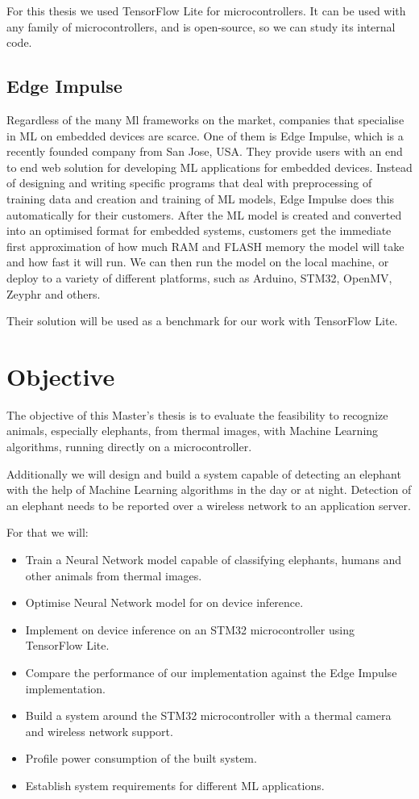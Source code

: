 For this thesis we used TensorFlow Lite for microcontrollers.
It can be used with any family of microcontrollers, and is open-source, so we can study its internal code.


\subsection{ Edge Impulse}

Regardless of the many Ml frameworks on the market, companies that specialise in ML on embedded devices are scarce.
One of them is Edge Impulse, which is a recently founded company from San Jose, USA.
They provide users with an end to end web solution for developing ML applications for embedded devices.
Instead of designing and writing specific programs that deal with preprocessing of training data and creation and training of ML models, Edge Impulse does this automatically for their customers.
After the ML model is created and converted into an optimised format for embedded systems, customers get the immediate first approximation of how much RAM and FLASH memory the model will take and how fast it will run.
We can then run the model on the local machine, or deploy to a variety of different platforms, such as Arduino, STM32, OpenMV, Zeyphr and others.

Their solution will be used as a benchmark for our work with TensorFlow Lite.


\section{ Objective}\label{objective}

The objective of this Master's thesis is to evaluate the feasibility to recognize animals, especially elephants, from thermal images, with Machine Learning algorithms, running directly on a microcontroller.

Additionally we will design and build a system capable of detecting an elephant with the help of Machine Learning algorithms in the day or at night.
Detection of an elephant needs to be reported over a wireless network to an application server.

For that we will:

\begin{itemize}
    \item Train a Neural Network model capable of classifying elephants, humans and other animals from thermal images.
    \item Optimise Neural Network model for on device inference.
    \item Implement on device inference on an STM32 microcontroller using TensorFlow Lite.
    \item Compare the performance of our implementation against the Edge Impulse implementation.
    \item Build a system around the STM32 microcontroller with a thermal camera and wireless network support.
    \item Profile power consumption of the built system.
    \item Establish system requirements for different ML applications.
\end{itemize}


